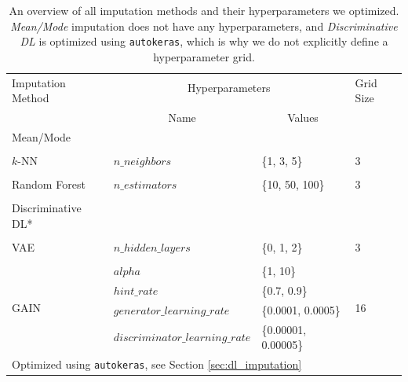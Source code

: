 \documentclass[utf8]{frontiersSCNS} %
\newcommand{\code}[1]{\texttt{#1}}
\begin{document}
\begin{table}[]
	\centering
	\begin{tabular}{@{}llll@{}}
		\toprule
		\multirow{2}{*}{Imputation Method} & \multicolumn{2}{c}{Hyperparameters}                          & \multirow{2}{*}{Grid Size} \\\cline{2-3}
		\\[-0.75em]
		& \multicolumn{1}{c}{Name}        & \multicolumn{1}{c}{Values} &                            \\ \midrule
		Mean/Mode                         &                                 &                            &                           \\
		\\[-0.5em]
		$k$-NN                             & $n\_neighbors$                  & \{1, 3, 5\}                & 3                          \\
		\\[-0.5em]
		Random Forest                      & $n\_estimators$                 & \{10, 50, 100\}            & 3                          \\
		\\[-0.5em]
		Discriminative DL*                   &                                 &                            &                            \\
		\\[-0.5em]
		VAE                                & $n\_hidden\_layers$             & \{0, 1, 2\}                & 3                          \\
		\\[-0.5em]
		\multirow{4}{*}{GAIN}              & $alpha$                         & \{1, 10\}                  & \multirow{4}{*}{16}        \\
		& $hint\_rate$                    & \{0.7, 0.9\}               &                            \\
		& $generator\_learning\_rate$     & \{0.0001, 0.0005\}         &                            \\
		& $discriminator\_learning\_rate$ & \{0.00001, 0.00005\}       &                            \\ \bottomrule
		\multicolumn{4}{l}{\footnotesize*Optimized using \code{autokeras}, see Section \ref{sec:dl_imputation}}
	\end{tabular}
	\caption{An overview of all imputation methods and their hyperparameters we optimized. \emph{Mean/Mode} imputation does not have any hyperparameters, and \emph{Discriminative DL} is optimized using \code{autokeras}, which is why we do not explicitly define a hyperparameter grid.}
	\label{tab:HPO}
\end{table}
\end{document}
